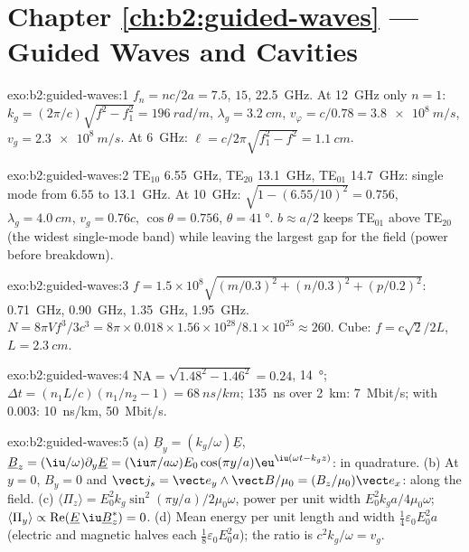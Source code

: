 \section*{Chapter \ref{ch:b2:guided-waves} --- Guided Waves and Cavities}

\begin{solution}{exo:b2:guided-waves:1}
$f_n = nc/2a = 7.5$, $15$, \qty{22.5}{GHz}. At \qty{12}{GHz} only $n = 1$: $k_g =
(2\pi/c)\sqrt{f^2 - f_1^2} = \qty{196}{rad/m}$, $\lambda_g = \qty{3.2}{cm}$, $v_\varphi = c/0.78
= \qty{3.8e8}{m/s}$, $v_g = \qty{2.3e8}{m/s}$. At \qty{6}{GHz}: $\ell = c/2\pi\sqrt{f_1^2 -
f^2} = \qty{1.1}{cm}$.
\end{solution}

\begin{solution}{exo:b2:guided-waves:2}
TE$_{10}$ \qty{6.55}{GHz}, TE$_{20}$ \qty{13.1}{GHz}, TE$_{01}$ \qty{14.7}{GHz}: single
mode from $6.55$ to \qty{13.1}{GHz}. At \qty{10}{GHz}: $\sqrt{1 - (6.55/10)^2} =
0.756$, $\lambda_g = \qty{4.0}{cm}$, $v_g = 0.76c$, $\cos\theta = 0.756$, $\theta = \qty{41}{\degree}$.
$b \approx a/2$ keeps TE$_{01}$ above TE$_{20}$ (the widest single-mode band)
while leaving the largest gap for the field (power before breakdown).
\end{solution}

\begin{solution}{exo:b2:guided-waves:3}
$f = 1.5 \times 10^8\sqrt{(m/0.3)^2 + (n/0.3)^2 + (p/0.2)^2}$: \qty{0.71}{GHz}, \qty{0.90}{GHz},
\qty{1.35}{GHz}, \qty{1.95}{GHz}. $N = 8\pi Vf^3/3c^3 = 8\pi \times 0.018 \times 1.56 \times 10^{28}/
8.1 \times 10^{25} \approx 260$. Cube: $f = c\sqrt2/2L$, $L = \qty{2.3}{cm}$.
\end{solution}

\begin{solution}{exo:b2:guided-waves:4}
$\mathrm{NA} = \sqrt{1.48^2 - 1.46^2} = 0.24$, \qty{14}{\degree}; $\Delta t = (n_1L/c)(n_1/n_2
- 1) = \qty{68}{ns/km}$; \qty{135}{ns} over \qty{2}{km}: \qty{7}{Mbit/s}; with $0.003$:
\qty{10}{ns/km}, \qty{50}{Mbit/s}.
\end{solution}

\begin{solution}{exo:b2:guided-waves:5}
(a) $\underline B_y = (k_g/\omega)\underline E$, $\underline B_z = (\iu/\omega)\partial_y\underline E = (\iu\pi/a\omega)
E_0\cos(\pi y/a)\eu^{\iu(\omega t - k_gz)}$: in quadrature. (b) At $y = 0$, $B_y = 0$ and
$\vect j_s = \vect e_y\wedge\vect B/\mu_0 = (B_z/\mu_0)\vect e_x$: along the field. (c)
$\langle\Pi_z\rangle = E_0^2k_g\sin^2(\pi y/a)/2\mu_0\omega$, power per unit width
$E_0^2k_ga/4\mu_0\omega$; $\langle\Pi_y\rangle \propto \operatorname{Re}(\underline E\,\iu\underline B_z^*)
= 0$. (d) Mean energy per unit length and width $\tfrac14\varepsilon_0E_0^2a$ (electric
and magnetic halves each $\tfrac18\varepsilon_0E_0^2a$); the ratio is $c^2k_g/\omega = v_g$.
\end{solution}


